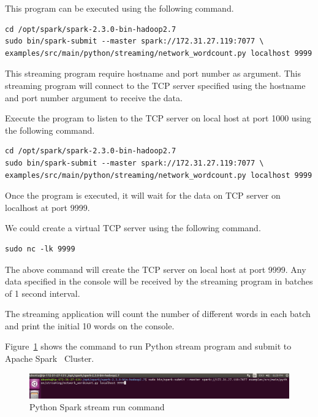 This program can be executed using the following command.

\begin{verbatim}
cd /opt/spark/spark-2.3.0-bin-hadoop2.7
sudo bin/spark-submit --master spark://172.31.27.119:7077 \
examples/src/main/python/streaming/network_wordcount.py localhost 9999
\end{verbatim}

This streaming program require hostname and port number as argument. This streaming program will connect to the TCP server specified using the hostname and port number argument to receive the data.

Execute the program to listen to the TCP server on local host at port 1000 using the following command.

\begin{verbatim}
cd /opt/spark/spark-2.3.0-bin-hadoop2.7
sudo bin/spark-submit --master spark://172.31.27.119:7077 \
examples/src/main/python/streaming/network_wordcount.py localhost 9999 
\end{verbatim}

Once the program is executed, it will wait for the data on TCP server on localhost at port 9999.

We could create a virtual TCP server using the following command.

\begin{verbatim}
sudo nc -lk 9999
\end{verbatim}

The above command will create the TCP server on local host at port 9999. Any data specified in the console will be received by the streaming program in batches of 1 second interval.

The streaming application will count the number of different words in each batch and print the initial 10 words on the console.

Figure~\ref{f:python-spark-stream-run-command} shows the command to run Python stream program and submit to Apache Spark~\cite{hid-sp18-511-www-spark} Cluster.

\begin{figure}[!ht]
	\centering\includegraphics[width=\columnwidth]{images/pythonstreamprogruncoammand.png}
	\caption{Python Spark stream run command}\label{f:python-spark-stream-run-command}
\end{figure}


